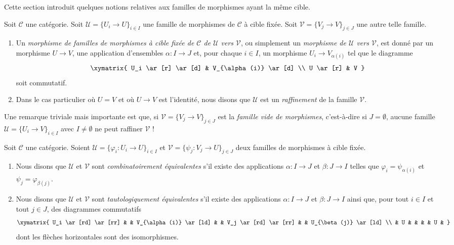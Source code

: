 \noindent
Cette section introduit quelques notions relatives aux familles de morphismes
ayant la même cible.

\begin{definition}
\label{definition-morphism-coverings}
Soit $\mathcal{C}$ une catégorie. Soit
$\mathcal{U} = \{U_i \to U\}_{i\in I}$ une famille de morphismes de
$\mathcal{C}$ à cible fixée. Soit
$\mathcal{V} = \{V_j \to V\}_{j\in J}$ une autre telle famille.
\begin{enumerate}
\item
Un {\it morphisme de familles de morphismes à cible fixée de $\mathcal{C}$ de
$\mathcal{U}$ vers $\mathcal{V}$}, ou simplement un {\it morphisme de
$\mathcal{U}$ vers $\mathcal{V}$}, est donné par un morphisme $U \to V$, une
application d’ensembles $\alpha : I \to J$ et, pour chaque $i\in I$, un
morphisme $U_i \to V_{\alpha(i)}$ tel que le diagramme
$$
\xymatrix{
U_i \ar[r] \ar[d]
&
V_{\alpha(i)} \ar[d]
\\
U \ar[r]
&
V
}
$$
soit commutatif.
\item Dans le cas particulier où $U = V$ et où $U \to V$ est l’identité,
nous disons que $\mathcal{U}$ est un {\it raffinement} de la famille
$\mathcal{V}$.
\end{enumerate}
\end{definition}

\noindent
Une remarque triviale mais importante est que, si
$\mathcal{V} = \{V_j \to V\}_{j \in J}$ est la {\it famille vide de
morphismes}, c’est-à-dire si $J = \emptyset$, aucune famille
$\mathcal{U} = \{U_i \to V\}_{i \in I}$ avec $I \not = \emptyset$ ne peut
raffiner $\mathcal{V}$ !

\begin{definition}
\label{definition-combinatorial-tautological}
Soit $\mathcal{C}$ une catégorie. Soient
$\mathcal{U} = \{\varphi_i : U_i \to U\}_{i\in I}$ et
$\mathcal{V} = \{\psi_j : V_j \to U\}_{j\in J}$ deux familles de morphismes
à cible fixée.
\begin{enumerate}
\item Nous disons que $\mathcal{U}$ et $\mathcal{V}$ sont
{\it combinatoirement équivalentes} s’il existe des applications
$\alpha : I \to J$ et $\beta : J\to I$ telles que
$\varphi_i = \psi_{\alpha(i)}$ et $\psi_j = \varphi_{\beta(j)}$.
\item Nous disons que $\mathcal{U}$ et $\mathcal{V}$ sont
{\it tautologiquement équivalentes} s’il existe des applications
$\alpha : I \to J$ et $\beta : J\to I$ ainsi que, pour tout $i\in I$ et tout
$j \in J$, des diagrammes commutatifs
$$
\xymatrix{
U_i \ar[rd] \ar[rr] & &
V_{\alpha(i)} \ar[ld] & &
V_j \ar[rd] \ar[rr] & &
U_{\beta(j)} \ar[ld] \\
&
U & & & &
U &
}
$$
dont les flèches horizontales sont des isomorphismes.
\end{enumerate}
\end{definition}

